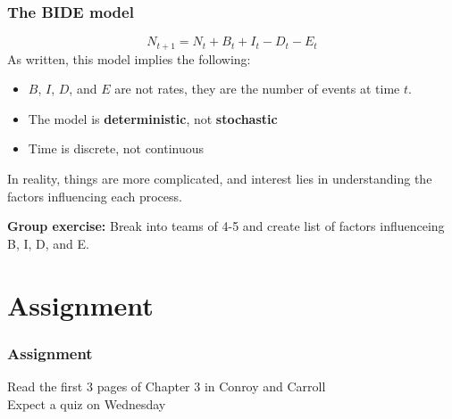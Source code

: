 \documentclass[color=usenames,dvipsnames]{beamer}\usepackage[]{graphicx}\usepackage[]{color}
\begin{document}
\begin{frame}
  \frametitle{The BIDE model}
  \huge
  \[
  N_{t+1} = N_t + B_t + I_t - D_t - E_t
  \]
  \large
  \vfill
  {%
    As written, this model implies the following:}
  \begin{itemize}%
    \item<1-> $B$, $I$, $D$, and $E$ are not rates, they
      are the number of events at time $t$.
    \item The model is {\bf deterministic}, not {\bf stochastic}
    \item Time is discrete, not continuous
  \end{itemize}
  \pause
  \vfill
  In reality, things are more complicated, and interest lies in
  understanding the factors influencing each process.\par
  \pause
  \vfill
  {\bf Group exercise:} Break into teams of 4-5 and create list of factors influenceing B, I, D, and E. 
\end{frame}



\section{Assignment}


\begin{frame}
  \frametitle{Assignment}
  \Large
  Read the first 3 pages of Chapter 3 in Conroy and Carroll \\
  \vfill
  Expect a quiz on Wednesday
\end{frame}
\end{document}
